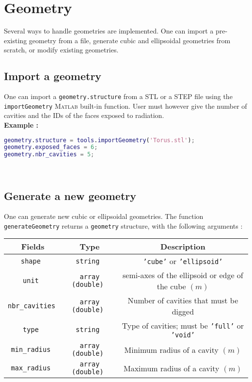 \section{Geometry}

Several ways to handle geometries are implemented. One can import a pre-existing geometry from a file, generate cubic and ellipsoidal geometries from scratch, or modify existing geometries.\\


\subsection{Import a geometry}

One can import a {\tt geometry.structure} from a STL or a STEP file using the {\tt importGeometry} \textsc{Matlab} built-in function. User must however give the number of cavities and the IDs of the faces exposed to radiation.\\

\textbf{Example :}\\

\begin{lstlisting}[language=Matlab]
geometry.structure = tools.importGeometry('Torus.stl');
geometry.exposed_faces = 6;
geometry.nbr_cavities = 5;
\end{lstlisting}
\ 

\subsection{Generate a new geometry}

One can generate new cubic or ellipsoidal geometries. The function {\tt generateGeometry} returns a {\tt geometry} structure, with the following arguments : 

\renewcommand{\arraystretch}{1.5}
\begin{table}[h]
    \centering
    \begin{tabular}{|>{\customfont}c|>{\customfont}c|>{\customfont}c|}
        \hline 
        \rowcolor{gray!30}
        \textbf{Fields} & \textbf{Type} & \textbf{Description} \\ \hline
        \tt shape & \tt string & {\tt 'cube'} or {\tt 'ellipsoid'} \\ \hline 
        \tt unit & \tt array (double) & semi-axes of the ellipsoid or edge of the cube $(m)$ \\ \hline 
        \tt nbr\_cavities	& \tt array (double) & Number of cavities that must be digged \\ \hline 
        \tt type & \tt string & Type of cavities; must be {\tt 'full'} or {\tt 'void'} \\ \hline
        \tt min\_radius & \tt array (double) & Minimum radius of a cavity $(m)$ \\ \hline 
        \tt max\_radius & \tt array (double) & Maximum radius of a cavity $(m)$ \\ \hline 
    \end{tabular}
\end{table}
\ 

